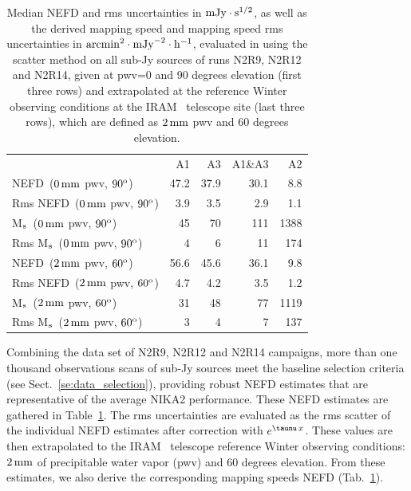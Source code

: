 \begin{table}[!thbp]
  \begin{center}
    \caption[NEFD estimates on all sub-Jy sources]{Median NEFD and rms
      uncertainties in $\rm{mJy}\cdot s^{1/2}$, as well as the derived mapping
      speed and mapping speed rms uncertainties in
    $\rm{arcmin}^2\cdot \rm{mJy}^{-2}\cdot\rm{h}^{-1}$, evaluated
      in using the scatter method on all sub-Jy sources of runs N2R9, N2R12
      and N2R14, given at pwv=0 and 90 degrees elevation (first three rows) and extrapolated at the
      reference Winter observing conditions at the IRAM
      \trentemetre\ telescope site (last three rows), which are defined
      as $2\,\rm{mm}$ pwv and 60 degrees elevation.}
    \label{tab:nefd_astro}
    \begin{tabular}{lrrrr}
      \hline\hline
      \noalign{\smallskip}
                    & A1      &   A3    &   A1\&A3 &    A2 \\
      \noalign{\smallskip}
      \hline
      \noalign{\smallskip}
      NEFD\, \small{($0\,\rm{mm}$ pwv, $90^{\rm{o}}$)}             & 47.2    & 37.9    &    30.1  &    8.8   \\
      Rms NEFD\, \small{($0\,\rm{mm}$ pwv, $90^{\rm{o}}$)}         &  3.9    &  3.5    &     2.9  &    1.1   \\
      M$_{\rm{s}}$\, \small{($0\,\rm{mm}$ pwv, $90^{\rm{o}}$)}      & 45      &  70     &    111   &   1388   \\
      Rms M$_{\rm{s}}$\, \small{($0\,\rm{mm}$ pwv, $90^{\rm{o}}$)}  &  4      &   6     &     11   &    174   \\
      \hline
      \noalign{\smallskip}
      NEFD\, \small{($2\,\rm{mm}$ pwv, $60^{\rm{o}}$)}             & 56.6    & 45.6    &    36.1  &    9.8   \\
      Rms NEFD\, \small{($2\,\rm{mm}$ pwv, $60^{\rm{o}}$)}         &  4.7    & 4.2     &     3.5  &    1.2   \\
      M$_{\rm{s}}$\, \small{($2\,\rm{mm}$ pwv, $60^{\rm{o}}$)}      &  31    & 48       &    77   &   1119   \\
      Rms M$_{\rm{s}}$\, \small{($2\,\rm{mm}$ pwv, $60^{\rm{o}}$)}  &   3    &  4       &     7     &  137   \\
      \hline
    \end{tabular}
\end{center}
\end{table}

Combining the data set of N2R9, N2R12 and N2R14 campaigns, more than one
thousand observations scans of sub-Jy sources meet the baseline selection
criteria (see Sect.~\ref{se:data_selection}), providing robust NEFD estimates
that are representative of the average NIKA2 performance. These NEFD estimates
are gathered in Table~\ref{tab:nefd_astro}. The rms uncertainties are evaluated
as the rms scatter of the individual NEFD estimates after correction with
$e^{\taunu\,x}$. These values are then extrapolated to the IRAM
\trentemetre\ telescope reference Winter observing conditions: $2\,\rm{mm}$ of
precipitable water vapor (pwv) and $60$ degrees elevation. From these estimates,
we also derive the corresponding mapping speeds NEFD (Tab.~\ref{tab:nefd_astro}).


